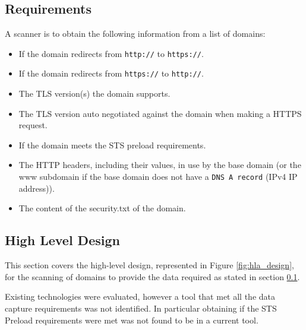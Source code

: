 \documentclass{mscreport}
\begin{document}
\subsection{Requirements}
\label{subsection:requirements}

A scanner is to obtain the following information from a list of domains:

\begin{itemize}
	\setlength\itemsep{0.1em}
    \item If the domain redirects from \texttt{http://} to \texttt{https://}.
    \item If the domain redirects from \texttt{https://} to \texttt{http://}.
    \item The TLS version(s) the domain supports.
    \item The TLS version auto negotiated against the domain when making a HTTPS request.
    \item If the domain meets the STS preload requirements.
    \item The HTTP headers, including their values, in use by the base domain (or the www subdomain if the base domain does not have a \texttt{DNS A record} (IPv4 IP address)).
    \item The content of the security.txt of the domain.
\end{itemize}

\subsection{High Level Design}
\label{subsection:hld}

This section covers the high-level design, represented in Figure \ref{fig:hla_design}, for the scanning of domains to provide the data required as stated in section
\ref{subsection:requirements}.

\vspace{0.3cm} \noindent
Existing technologies were evaluated, however a tool that met all the data capture requirements was not identified. In particular obtaining if the STS Preload requirements were met was not found to be in a current tool.

\end{document}
